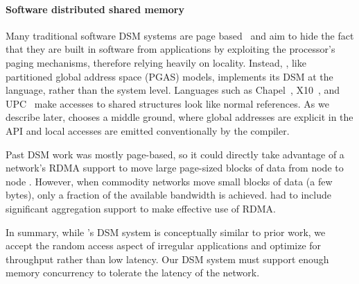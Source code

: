 \paragraph{Software distributed shared memory}
Many traditional software DSM systems are page based~\cite{Treadmarks,munin}
and aim to hide the fact that they are built in software from applications by
exploiting the processor's paging mechanisms, therefore relying heavily on
locality. Instead, \Grappa, like partitioned global address space (PGAS)
models, implements its DSM at the language, rather than the system level.
Languages such as Chapel~\cite{Chamberlain:2007}, X10~\cite{X10:2005}, and
UPC~\cite{upc:2005} make accesses to shared structures look like normal
references. As we describe later, \Grappa chooses a middle ground, where global
addresses are explicit in the API and local accesses are emitted
conventionally by the compiler.

Past DSM work was mostly page-based, so it could directly take advantage of a
network's RDMA support to move large page-sized blocks of data from node to
node . However, when commodity networks move small blocks of
data (a few bytes), only a fraction of the available bandwidth is achieved. \Grappa had to include significant aggregation support to make effective use of RDMA.

In summary, while \Grappa's DSM system is conceptually similar to prior work,
we accept the random access aspect of irregular applications and optimize for
throughput rather than low latency. Our DSM system must support enough memory
concurrency to tolerate the latency of the network.





